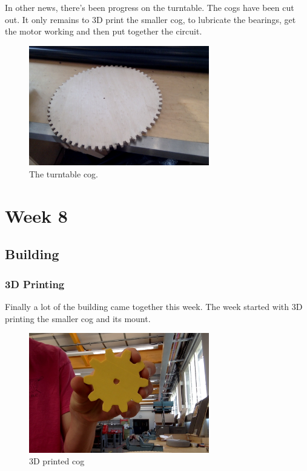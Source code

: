 \documentclass[a4paper]{article}
\begin{document}
In other news, there's been progress on the turntable. 
The cogs have been cut out. 
It only remains to 3D print the smaller cog, to lubricate the bearings, get the motor working and then put together the circuit.

\begin{figure}[H]
  \centering
    \includegraphics[width=0.7\textwidth]{figures/cog.jpg}
    \caption{The turntable cog.}
  \label{fig:f2}
\end{figure}

\section{Week 8}

\subsection{Building}
\subsubsection{3D Printing}
Finally a lot of the building came together this week.
The week started with 3D printing the smaller cog and its mount.

\begin{figure}[H]
  \centering
    \includegraphics[width=0.7\textwidth]{figures/printed_cog.jpg}
    \caption{3D printed cog}
  \label{fig:f2}
\end{figure}
\end{document}
